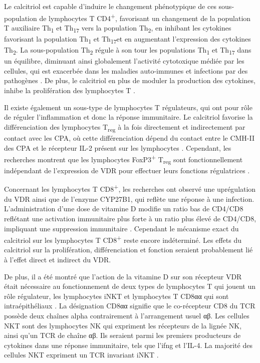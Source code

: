 \documentclass[
  a4paper,
  DIV=11,
  numbers=noendperiod,
  listof=totoc]{scrreprt}
\begin{document}
Le calcitriol est capable d'induire le changement phénotypique de ces
sous-population de lymphocytes T CD4\textsuperscript{+}, favorisant un
changement de la population T auxiliaire Th\textsubscript{1} et
Th\textsubscript{17} vers la population Th\textsubscript{2}, en inhibant
les cytokines favorisant la population Th\textsubscript{1} et
Th\textsubscript{17}et en augmentant l'expression des cytokines
Th\textsubscript{2}. La sous-population Th\textsubscript{2} régule à son
tour les populations Th\textsubscript{1} et Th\textsubscript{17} dans un
équilibre, diminuant ainsi globalement l'activité cytotoxique médiée par
les cellules, qui est exacerbée dans les maladies auto-immunes et
infections par des pathogènes \autocite{Meza-Meza.2022}. De plus, le
calcitriol en plus de moduler la production des cytokines, inhibe la
prolifération des lymphocytes T \autocite{Cantorna.2015}.

Il existe également un sous-type de lymphocytes T régulateurs, qui ont
pour rôle de réguler l'inflammation et donc la réponse immunitaire. Le
calcitriol favorise la différenciation des lymphocytes
T\textsubscript{reg} à la fois directement et indirectement par contact
avec les \ac{CPA}, où cette différenciation dépend du contact entre le
\ac{CMH-II} des \ac{CPA} et le récepteur \ac{IL-2} présent sur les
lymphocytes \autocite{Charoenngam.2020}. Cependant, les recherches
montrent que les lymphocytes FoxP3\textsuperscript{+}
T\textsubscript{reg} sont fonctionnellement indépendant de l'expression
de VDR pour effectuer leurs fonctions régulatrices
\autocite{Cantorna.2010}.

Concernant les lymphocytes T CD8\textsuperscript{+}, les recherches ont
observé une uprégulation du VDR ainsi que de l'enzyme CYP27B1, qui
reflète une réponse à une infection. L'administration d'une dose de
vitamine D modifie un ratio bas de CD4/CD8 reflétant une activation
immunitaire plus forte à un ratio plus élevé de CD4/CD8, impliquant une
suppression immunitaire \autocite{Charoenngam.2020}. Cependant le
mécanisme exact du calcitriol sur les lymphocytes T
CD8\textsuperscript{+} reste encore indéterminé. Les effets du
calcitriol sur la prolifération, différenciation et fonction seraient
probablement lié à l'effet direct et indirect du VDR.

De plus, il a été montré que l'action de la vitamine D sur son récepteur
VDR était nécessaire au fonctionnement de deux types de lymphocytes T
qui jouent un rôle régulateur, les lymphocytes \ac{iNKT} et lymphocytes
T CD8αα qui sont intraépithéliaux \autocite{Cheroutre.2008}. La
désignation CD8αα signifie que le co-récepteur CD8 du \ac{TCR} possède
deux chaînes alpha contrairement à l'arrangement usuel αβ. Les cellules
NKT sont des lymphocytes NK qui expriment les récepteurs de la lignée
NK, ainsi qu'un \ac{TCR} de chaîne αβ. Ils seraient parmi les premiers
producteurs de cytokines dans une réponse immunitaire, tels que
l'\ac{ifng} et l'\ac{IL-4}. La majorité des cellules NKT expriment un
TCR invariant \acs{iNKT} \autocite{Cantorna.2010}.
\end{document}
